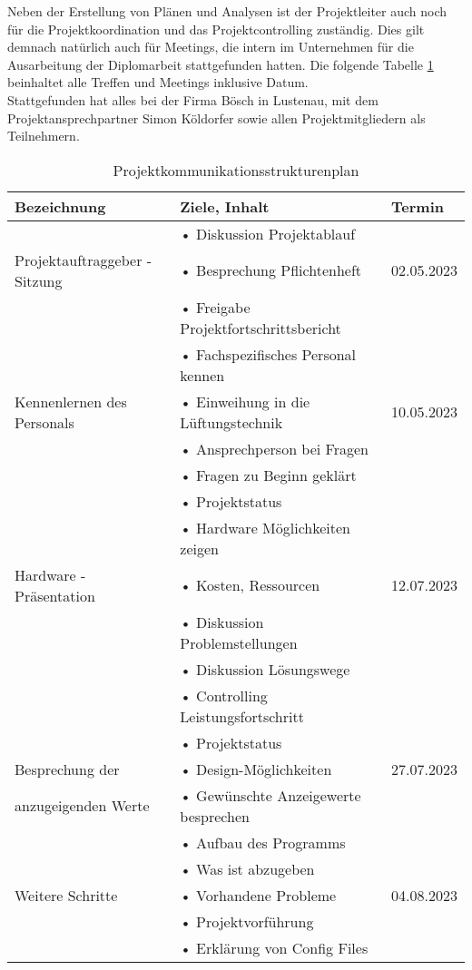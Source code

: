 Neben der Erstellung von Plänen und Analysen ist der Projektleiter auch noch für die Projektkoordination und das Projektcontrolling zuständig. Dies gilt demnach natürlich auch für Meetings, die intern im Unternehmen für die Ausarbeitung der Diplomarbeit stattgefunden hatten. Die folgende Tabelle \ref{tab:strukturenplan} beinhaltet alle Treffen und Meetings inklusive Datum. \\
Stattgefunden hat alles bei der Firma Bösch in Lustenau, mit dem Projektansprechpartner Simon Köldorfer sowie allen Projektmitgliedern als Teilnehmern.

\begin{table}[H]
	\caption{Projektkommunikationsstrukturenplan}
	\label{tab:strukturenplan}
	\centering
	\begin{tabular}{p{} | p{} | p{}}
		\toprule
		\textbf{Bezeichnung} & \textbf{Ziele, Inhalt} & \textbf{Termin} \\
		\midrule
			& • Diskussion Projektablauf & \\
		Projektauftraggeber - Sitzung &  • Besprechung Pflichtenheft  & 02.05.2023 \\
 			& • Freigabe Projektfortschrittsbericht & \\
 		\midrule
 			& • Fachspezifisches Personal kennen & \\
 		Kennenlernen des Personals	& • Einweihung in die Lüftungstechnik & 10.05.2023 \\
 			& • Ansprechperson bei Fragen & \\
 			& • Fragen zu Beginn geklärt & \\
 		\midrule
 			& •	Projektstatus & \\
 			& •	Hardware Möglichkeiten zeigen & \\
 		Hardware - Präsentation	& • Kosten, Ressourcen & 12.07.2023 \\ 
 			& • Diskussion Problemstellungen & \\
 			& • Diskussion Lösungswege & \\
 			& •	Controlling Leistungsfortschritt & \\
 		\midrule
 			& •	Projektstatus & \\
 		Besprechung der & •	Design-Möglichkeiten & 27.07.2023 \\
 		anzugeigenden Werte& •	Gewünschte Anzeigewerte besprechen & \\
 			& • Aufbau des Programms  & \\
 		\midrule
 			& •	Was ist abzugeben & \\
 		Weitere Schritte & • Vorhandene Probleme & 04.08.2023 \\
 			& •	Projektvorführung & \\
 			& •	Erklärung von Config Files & \\
		\bottomrule
	\end{tabular}
\end{table}
